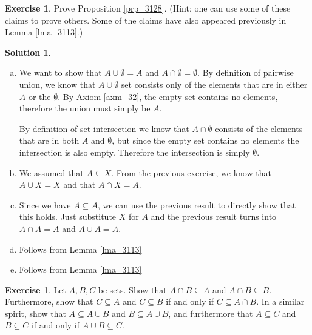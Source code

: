 \documentclass[a4paper, twocolumn]{report}
\newcounter{exercise} \numberwithin{exercise}{section}
\theoremstyle{definition}
\newtheorem{exc}[exercise]{Exercise}
\theoremstyle{solution}
\newtheorem*{sltn}{Solution}
\newcommand{\union}{\cup}
\newcommand{\intrsct}{\cap}
\begin{document}
\begin{exc}
  Prove Proposition \ref{prp_3128}. (Hint: one can use some of these claims to
  prove others. Some of the claims have also appeared previously in Lemma
  \ref{lma_3113}.)
\end{exc}
\begin{sltn}
  \begin{enumerate}[(a)]
    \item We want to show that $A \union \emptyset = A$ and $A \intrsct \emptyset = \emptyset$.
    By definition of pairwise union, we know that $A \union \emptyset$ set
    consists only of the elements that are in either $A$ or the $\emptyset$. By
    Axiom \ref{axm_32}, the empty set contains no elements, therefore the union
    must simply be $A$.

    By definition of set intersection we know that $A \intrsct \emptyset$
    consists of the elements that are in both $A$ and $\emptyset$, but since
    the empty set contains no elements the intersection is also empty.
    Therefore the intersection is simply $\emptyset$. 

  \item  We assumed that $A \subseteq X$. From the previous exercise, we know
    that $A \union X = X$ and that $A \intrsct X = A$.

  \item Since we have $A \subseteq A$, we can use the previous result to
    directly show that this holds.  Just substitute $X$ for $A$ and the
    previous result turns into $A \intrsct A = A$ and $A \union A = A$.

  \item Follows from Lemma \ref{lma_3113}

  \item Follows from Lemma \ref{lma_3113}

    
  \end{enumerate} 
\end{sltn}

\begin{exc}
  Let $A, B, C$ be sets. Show that $A \intrsct B \subseteq A$ and $A \intrsct B
  \subseteq B$.  Furthermore, show that $C \subseteq A$ and $C \subseteq B$ if
  and only if $C \subseteq A \intrsct B$.  In a similar spirit, show that $A
  \subseteq A\union B$ and $B \subseteq A \union B$, and furthermore that $A
  \subseteq C$ and $B \subseteq C$ if and only if $A \union B \subseteq C$.
\end{exc}
\end{document}
